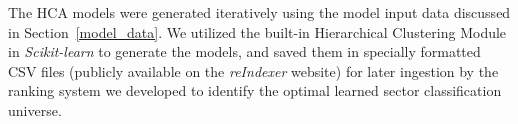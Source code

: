 \documentclass[../main.tex]{subfiles}
\begin{document}
The HCA models were generated iteratively using the model input data discussed in Section~\ref{model_data}. We utilized the built-in Hierarchical Clustering Module in \textit{Scikit-learn} to generate the models, and saved them in specially formatted CSV files (publicly available on the \textit{reIndexer} website) for later ingestion by the ranking system we developed to identify the optimal learned sector classification universe.
\end{document}
